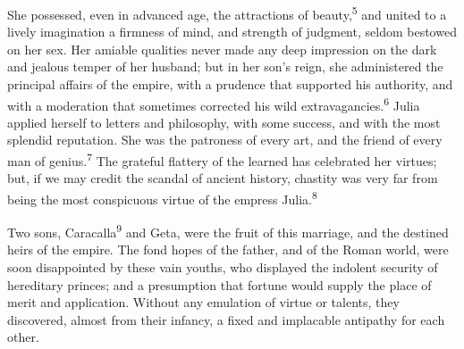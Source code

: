 She possessed, even in advanced age, the attractions of beauty,\textsuperscript{5}
and united to a lively imagination a firmness of mind, and
strength of judgment, seldom bestowed on her sex. Her amiable
qualities never made any deep impression on the dark and jealous
temper of her husband; but in her son’s reign, she administered
the principal affairs of the empire, with a prudence that
supported his authority, and with a moderation that sometimes
corrected his wild extravagancies.\textsuperscript{6} Julia applied herself to
letters and philosophy, with some success, and with the most
splendid reputation. She was the patroness of every art, and the
friend of every man of genius.\textsuperscript{7} The grateful flattery of the
learned has celebrated her virtues; but, if we may credit the
scandal of ancient history, chastity was very far from being the
most conspicuous virtue of the empress Julia.\textsuperscript{8}







Two sons, Caracalla\textsuperscript{9} and Geta, were the fruit of this marriage,
and the destined heirs of the empire. The fond hopes of the
father, and of the Roman world, were soon disappointed by these
vain youths, who displayed the indolent security of hereditary
princes; and a presumption that fortune would supply the place of
merit and application. Without any emulation of virtue or
talents, they discovered, almost from their infancy, a fixed and
implacable antipathy for each other.


